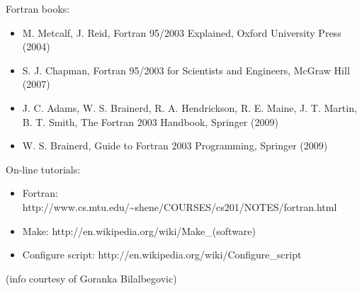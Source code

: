 \documentclass[12pt,a4paper]{article}
\begin{document}
Fortran books:
\begin{itemize}
\item 
M. Metcalf, J. Reid, Fortran 95/2003 Explained, Oxford University Press (2004) 
\item
S. J. Chapman, Fortran 95/2003 for Scientists and Engineers, McGraw Hill (2007) 
\item
J. C. Adams, W. S. Brainerd, R. A. Hendrickson, R. E. Maine, J. T. Martin,
B. T. Smith, The Fortran 2003 Handbook, Springer (2009) 
\item
W. S. Brainerd, Guide to Fortran 2003 Programming, Springer (2009)
\end{itemize}
On-line tutorials:
\begin{itemize}
\item Fortran:
http://www.cs.mtu.edu/\~{}shene/COURSES/cs201/NOTES/fortran.html
\item Make:  
http://en.wikipedia.org/wiki/Make\_(software)
\item Configure script:
http://en.wikipedia.org/wiki/Configure\_script
\end{itemize}
(info courtesy of Goranka Bilalbegovic)
\end{document}
